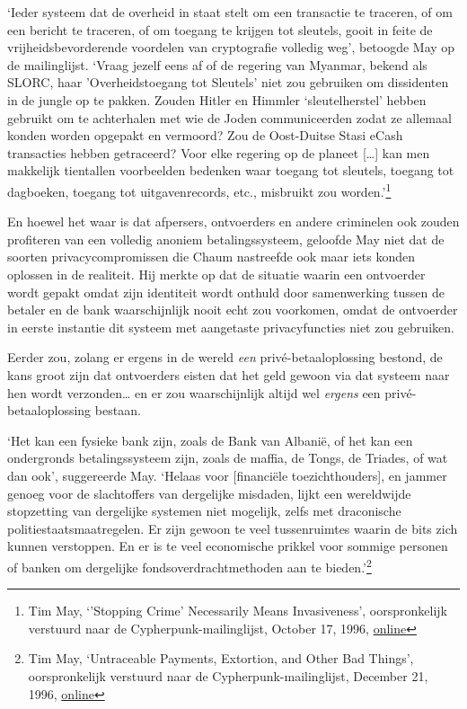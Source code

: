 \documentclass[smalldemyvopaper,11pt,twoside,onecolumn,openright,extrafontsizes,hidelinks]{memoir}
\begin{document}
`Ieder systeem dat de overheid in staat stelt om een transactie te
traceren, of om een bericht te traceren, of om toegang te krijgen tot
sleutels, gooit in feite de vrijheidsbevorderende voordelen van
cryptografie volledig weg', betoogde May op de mailinglijst. `Vraag
jezelf eens af of de regering van Myanmar, bekend als SLORC, haar
'Overheidstoegang tot Sleutels' niet zou gebruiken om dissidenten in de
jungle op te pakken. Zouden Hitler en Himmler `sleutelherstel' hebben
gebruikt om te achterhalen met wie de Joden communiceerden zodat ze
allemaal konden worden opgepakt en vermoord? Zou de Oost-Duitse Stasi
eCash transacties hebben getraceerd? Voor elke regering op de planeet
{[}\ldots{]} kan men makkelijk tientallen voorbeelden bedenken waar
toegang tot sleutels, toegang tot dagboeken, toegang tot
uitgavenrecords, etc., misbruikt zou worden.'\footnote{Tim May,
  `'Stopping Crime' Necessarily Means Invasiveness', oorspronkelijk
  verstuurd naar de Cypherpunk-mailinglijst, October 17, 1996,
  \href{https://cypherpunks.venona.com/date/1996/10/msg01269.html}{online}}

En hoewel het waar is dat afpersers, ontvoerders en andere criminelen
ook zouden profiteren van een volledig anoniem betalingssysteem,
geloofde May niet dat de soorten privacycompromissen die Chaum
nastreefde ook maar iets konden oplossen in de realiteit. Hij merkte op
dat de situatie waarin een ontvoerder wordt gepakt omdat zijn identiteit
wordt onthuld door samenwerking tussen de betaler en de bank
waarschijnlijk nooit echt zou voorkomen, omdat de ontvoerder in eerste
instantie dit systeem met aangetaste privacyfuncties niet zou gebruiken.

Eerder zou, zolang er ergens in de wereld \emph{een}
privé-betaaloplossing bestond, de kans groot zijn dat ontvoerders eisten
dat het geld gewoon via dat systeem naar hen wordt verzonden\ldots{} en
er zou waarschijnlijk altijd wel \emph{ergens} een privé-betaaloplossing
bestaan.

`Het kan een fysieke bank zijn, zoals de Bank van Albanië, of het kan
een ondergronds betalingssysteem zijn, zoals de maffia, de Tongs, de
Triades, of wat dan ook', suggereerde May. `Helaas voor {[}financiële
toezichthouders{]}, en jammer genoeg voor de slachtoffers van dergelijke
misdaden, lijkt een wereldwijde stopzetting van dergelijke systemen niet
mogelijk, zelfs met draconische politiestaatsmaatregelen. Er zijn gewoon
te veel tussenruimtes waarin de bits zich kunnen verstoppen. En er is te
veel economische prikkel voor sommige personen of banken om dergelijke
fondsoverdrachtmethoden aan te bieden.'\footnote{Tim May, `Untraceable
  Payments, Extortion, and Other Bad Things', oorspronkelijk verstuurd
  naar de Cypherpunk-mailinglijst, December 21, 1996,
  \href{https://cypherpunks.venona.com/date/1996/12/msg01468.html}{online}}
\end{document}
